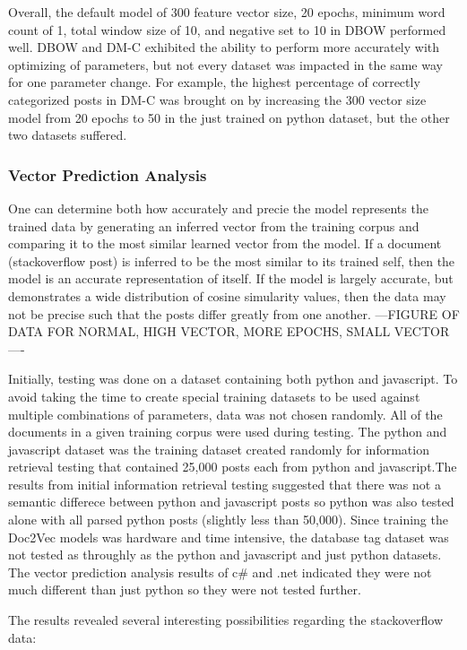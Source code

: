 Overall, the default model of 300 feature vector size, 20 epochs, minimum word count of 1, total window size of 10, and negative set to 10 in DBOW performed well. DBOW and DM-C exhibited the ability to perform more accurately with optimizing of parameters, but not every dataset was impacted in the same way for one parameter change. For example, the highest percentage of correctly categorized posts in DM-C was brought on by increasing the 300 vector size model from 20 epochs to 50 in the just trained on python dataset, but the other two datasets suffered.

\subsubsection{Vector Prediction Analysis}

One can determine both how accurately and precie the model represents the trained data by generating an inferred vector from the training corpus and comparing it to the most similar learned vector from the model. If a document (stackoverflow post) is inferred to be the most similar to its trained self, then the model is an accurate representation of itself. If the model is largely accurate, but demonstrates a wide distribution of cosine simularity values, then the data may not be precise such that the posts differ greatly from one another.  ---FIGURE OF DATA FOR NORMAL, HIGH VECTOR, MORE EPOCHS, SMALL VECTOR----

Initially, testing was done on a dataset containing both python and javascript. To avoid taking the time to create special training datasets to be used against multiple combinations of parameters, data was not chosen randomly. All of the documents in a given training corpus were used during testing. The python and javascript dataset was the training dataset created randomly for information retrieval testing that contained 25,000 posts each from python and javascript.The results from initial information retrieval testing suggested that there was not a semantic differece between python and javascript posts so python was also tested alone with all parsed python posts (slightly less than 50,000). Since training the Doc2Vec models was hardware and time intensive, the database tag dataset was not tested as throughly as the python and javascript and just python datasets. The vector prediction analysis results of c\# and .net indicated they were not much different than just python so they were not tested further.  

The results revealed several interesting possibilities regarding the stackoverflow data:

